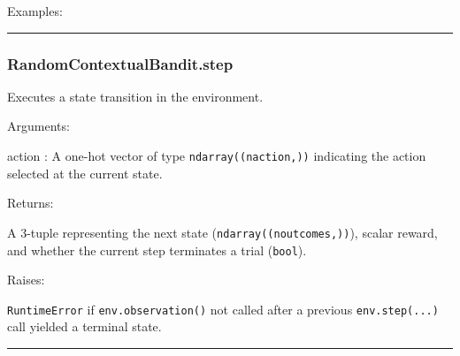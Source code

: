 Examples:

\begin{Shaded}
\begin{Highlighting}[]
\OperatorTok{=}
\end{Highlighting}
\end{Shaded}

\begin{center}\rule{0.5\linewidth}{\linethickness}\end{center}

\subsubsection{RandomContextualBandit.step}\label{randomcontextualbandit.step}

\begin{Shaded}
\begin{Highlighting}[]
\end{Highlighting}
\end{Shaded}

Executes a state transition in the environment.

Arguments:

action : A one-hot vector of type \texttt{ndarray((naction,))}
indicating the action selected at the current state.

Returns:

A 3-tuple representing the next state (\texttt{ndarray((noutcomes,))}),
scalar reward, and whether the current step terminates a trial
(\texttt{bool}).

Raises:

\texttt{RuntimeError} if \texttt{env.observation()} not called after a
previous \texttt{env.step(...)} call yielded a terminal state.

\begin{center}\rule{0.5\linewidth}{\linethickness}\end{center}
